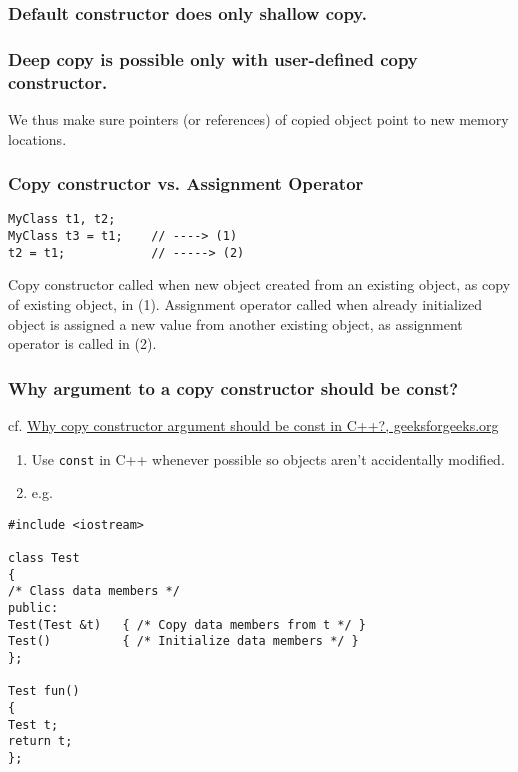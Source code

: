 \documentclass[10pt]{amsart}
\begin{document}
\begin{multicols*}{2}
\subsubsection{Default constructor does only shallow copy.}  

\subsubsection{Deep copy is possible only with user-defined copy constructor.}  

We thus make sure pointers (or references) of copied object point to new memory locations.  

\subsubsection{Copy constructor vs. Assignment Operator}  

\begin{lstlisting}  
MyClass t1, t2; 
MyClass t3 = t1; 	// ----> (1)
t2 = t1; 			// -----> (2)
\end{lstlisting}

Copy constructor called when new object created from an existing object, as copy of existing object, in (1).  
Assignment operator called when already initialized object is assigned a new value from another existing object, as assignment operator is called in (2).  

\subsubsection{Why argument to a copy constructor should be const?  } 

cf. \href{http://www.geeksforgeeks.org/copy-constructor-argument-const/}{Why copy constructor argument should be const in C++?, geeksforgeeks.org}

\begin{enumerate}
	\item Use \verb|const| in C++ whenever possible so objects aren't accidentally modified.  
	\item e.g.  
\end{enumerate}

\begin{lstlisting}  
#include <iostream>  

class Test
{
/* Class data members */
public:
Test(Test &t) 	{ /* Copy data members from t */ } 
Test()			{ /* Initialize data members */ }
};

Test fun() 
{
Test t;
return t;
};


\end{lstlisting}
\end{multicols*}
\end{document}
